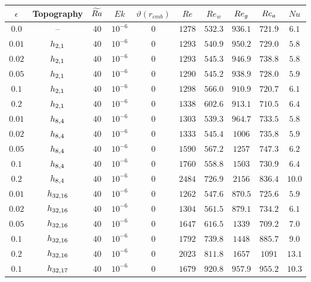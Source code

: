 \begin{table}
\begin{center}
\begin{tabular}{c c c c c c c c c c}
\hline
\hline
$\epsilon$ & Topography & $\widetilde{Ra}$ & $Ek$ & $\vartheta(r_{cmb})$ & $Re$ & $Re_w$ & $Re_{{g}}$ & $Re_{{a}}$ & $Nu$\\
\hline
$0.0$ & -- & $40$ & $10^{-6}$ & 0 &$1278$ & $532.3$ & $936.1$ & $721.9$ & $6.1$ \\
 $0.01$ & $h_{2,1}$ & $40$ & $10^{-6}$ & 0 &$1293$ & $540.9$ & $950.2$ & $729.0$ & $5.8$ \\
 $0.02$ & $h_{2,1}$ & $40$ & $10^{-6}$ & 0 &$1293$ & $545.3$ & $946.9$ & $738.8$ & $5.8$ \\
 $0.05$ & $h_{2,1}$ & $40$ & $10^{-6}$ & 0 &$1290$ & $545.2$ & $938.9$ & $728.0$ & $5.9$ \\
 $0.1$ & $h_{2,1}$ & $40$ & $10^{-6}$ & 0 &$1298$ & $566.0$ & $910.9$ & $720.7$ & $6.1$ \\
 $0.2$ & $h_{2,1}$ & $40$ & $10^{-6}$ & 0 &$1338$ & $602.6$ & $913.1$ & $710.5$ & $6.4$ \\
 $0.01$ & $h_{8,4}$ & $40$ & $10^{-6}$ & 0 &$1303$ & $539.3$ & $964.7$ & $733.5$ & $5.8$ \\
 $0.02$ & $h_{8,4}$ & $40$ & $10^{-6}$ & 0 &$1333$ & $545.4$ & $1006$ & $735.8$ & $5.9$ \\
 $0.05$ & $h_{8,4}$ & $40$ & $10^{-6}$ & 0 &$1590$ & $567.2$ & $1257$ & $747.3$ & $6.2$ \\
 $0.1$ & $h_{8,4}$ & $40$ & $10^{-6}$ & 0 &$1760$ & $558.8$ & $1503$ & $730.9$ & $6.4$ \\
 $0.2$ & $h_{8,4}$ & $40$ & $10^{-6}$ & 0 &$2484$ & $726.9$ & $2156$ & $836.4$ & $10.0$ \\
 $0.01$ & $h_{32,16}$ & $40$ & $10^{-6}$ & 0 &$1262$ & $547.6$ & $870.5$ & $725.6$ & $5.9$ \\
 $0.02$ & $h_{32,16}$ & $40$ & $10^{-6}$ & 0 &$1304$ & $561.5$ & $879.1$ & $734.2$ & $6.1$ \\
 $0.05$ & $h_{32,16}$ & $40$ & $10^{-6}$ & 0 &$1647$ & $616.5$ & $1339$ & $709.2$ & $7.0$ \\
 $0.1$ & $h_{32,16}$ & $40$ & $10^{-6}$ & 0 &$1792$ & $739.8$ & $1448$ & $885.7$ & $9.0$ \\
 $0.2$ & $h_{32,16}$ & $40$ & $10^{-6}$ & 0 &$2023$ & $811.8$ & $1657$ & $1091$ & $13.1$ \\
 $0.1$ & $h_{32,17}$ & $40$ & $10^{-6}$ & 0 &$1679$ & $920.8$ & $957.9$ & $955.2$ & $10.3$ \\

\end{tabular}
\end{center}
\end{table}

